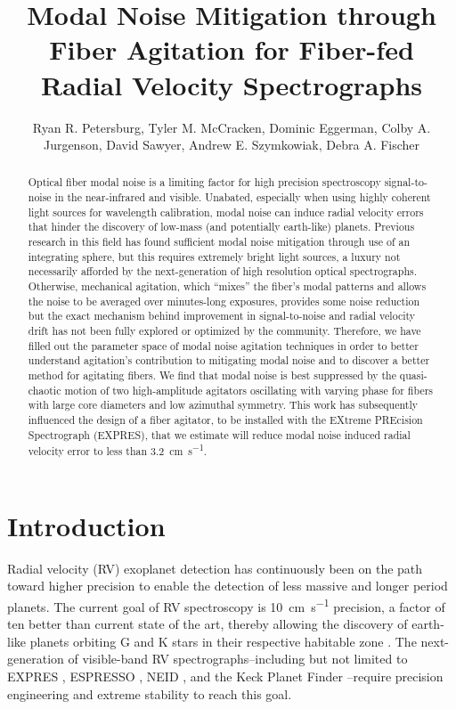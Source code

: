 \documentclass[twocolumn]{emulateapj}
\begin{document}
\title{Modal Noise Mitigation through Fiber Agitation for Fiber-fed Radial Velocity Spectrographs}

\author{Ryan R. Petersburg, Tyler M. McCracken, Dominic Eggerman, Colby A. Jurgenson, David Sawyer, Andrew E. Szymkowiak, Debra A. Fischer}

\begin{abstract}

Optical fiber modal noise is a limiting factor for high precision spectroscopy signal-to-noise in the near-infrared and visible. Unabated, especially when using highly coherent light sources for wavelength calibration, modal noise can induce radial velocity errors that hinder the discovery of low-mass (and potentially earth-like) planets. Previous research in this field has found sufficient modal noise mitigation through use of an integrating sphere, but this requires extremely bright light sources, a luxury not necessarily afforded by the next-generation of high resolution optical spectrographs. Otherwise, mechanical agitation, which ``mixes'' the fiber's modal patterns and allows the noise to be averaged over minutes-long exposures, provides some noise reduction but the exact mechanism behind improvement in signal-to-noise and radial velocity drift has not been fully explored or optimized by the community. Therefore, we have filled out the parameter space of modal noise agitation techniques in order to better understand agitation's contribution to mitigating modal noise and to discover a better method for agitating fibers. We find that modal noise is best suppressed by the quasi-chaotic motion of two high-amplitude agitators oscillating with varying phase for fibers with large core diameters and low azimuthal symmetry. This work has subsequently influenced the design of a fiber agitator, to be installed with the EXtreme PREcision Spectrograph (EXPRES), that we estimate will reduce modal noise induced radial velocity error to less than {\SI{3.2}{\centi\meter\per\second}}.

\end{abstract}


\section{Introduction}
\label{sec:intro}

Radial velocity (RV) exoplanet detection has continuously been on the path toward higher precision to enable the detection of less massive and longer period planets. The current goal of RV spectroscopy is \SI{10}{\centi\meter\per\second} precision, a factor of ten better than current state of the art, thereby allowing the discovery of earth-like planets orbiting G and K stars in their respective habitable zone \citep{Fischer2016}. The next-generation of visible-band RV spectrographs--including but not limited to EXPRES \citep{Jurgenson2016}, ESPRESSO \citep{Megevand2012}, NEID \citep{Schwab2016}, and the Keck Planet Finder \citep{Gibson2016}--require precision engineering and extreme stability to reach this goal.
\end{document}
